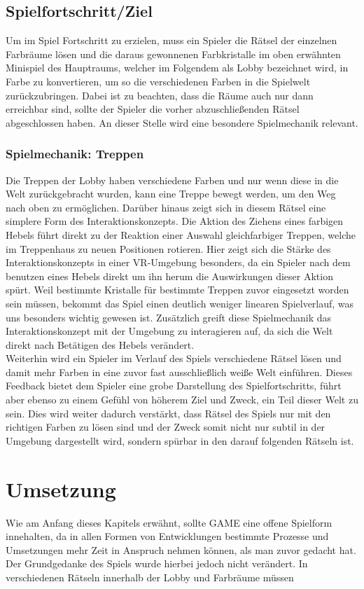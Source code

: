 \subsection{Spielfortschritt/Ziel}
Um im Spiel Fortschritt zu erzielen, muss ein Spieler die Rätsel der einzelnen Farbräume lösen und die daraus gewonnenen Farbkristalle im oben erwähnten Minispiel des Hauptraums, welcher im Folgendem als Lobby bezeichnet wird, in Farbe zu konvertieren, um so die verschiedenen Farben in die Spielwelt zurückzubringen.
Dabei ist zu beachten, dass die Räume auch nur dann erreichbar sind, sollte der Spieler die vorher abzuschließenden Rätsel abgeschlossen haben. An dieser Stelle wird eine besondere Spielmechanik relevant.
\subsubsection{Spielmechanik: Treppen}
Die Treppen der Lobby haben verschiedene Farben und nur wenn diese in die Welt zurückgebracht wurden, kann eine Treppe bewegt werden, um den Weg nach oben zu ermöglichen. Darüber hinaus zeigt sich in diesem Rätsel eine simplere Form des Interaktionskonzepts. Die Aktion des Ziehens eines farbigen Hebels führt direkt zu der Reaktion einer Auswahl gleichfarbiger Treppen, welche im Treppenhaus zu neuen Positionen rotieren. Hier zeigt sich die Stärke des Interaktionskonzepts in einer VR-Umgebung besonders, da ein Spieler nach dem benutzen eines Hebels direkt um ihn herum die Auswirkungen dieser Aktion spürt. Weil bestimmte Kristalle für bestimmte Treppen zuvor eingesetzt worden sein müssen, bekommt das Spiel einen deutlich weniger linearen Spielverlauf, was uns besonders wichtig gewesen ist. Zusätzlich greift diese Spielmechanik das Interaktionskonzept mit der Umgebung zu interagieren auf, da sich die Welt direkt nach Betätigen des Hebels verändert.\\
Weiterhin wird ein Spieler im Verlauf des Spiels verschiedene Rätsel lösen und damit mehr Farben in eine zuvor fast ausschließlich weiße Welt einführen. Dieses Feedback bietet dem Spieler eine grobe Darstellung des Spielfortschritts, führt aber ebenso zu einem Gefühl von höherem Ziel und Zweck, ein Teil dieser Welt zu sein. Dies wird weiter dadurch verstärkt, dass Rätsel des Spiels nur mit den richtigen Farben zu lösen sind und der Zweck somit nicht nur subtil in der Umgebung dargestellt wird, sondern spürbar in den darauf folgenden Rätseln ist.\\

\section{Umsetzung}
Wie am Anfang dieses Kapitels erwähnt, sollte GAME eine offene Spielform innehalten, da in allen Formen von Entwicklungen bestimmte Prozesse und Umsetzungen mehr Zeit in Anspruch nehmen können, als man zuvor gedacht hat. Der Grundgedanke des Spiels wurde hierbei jedoch nicht verändert. In verschiedenen Rätseln innerhalb der Lobby und Farbräume müssen

